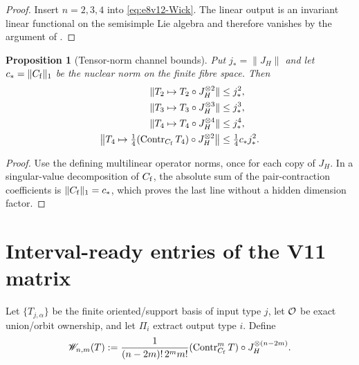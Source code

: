 \documentclass[11pt,oneside]{book}
\newtheorem{proposition}[theorem]{Proposition}
\theoremstyle{definition}
\theoremstyle{remark}
\begin{document}
\begin{proof}
Insert \(n=2,3,4\) into \eqref{eq:e8v12-Wick}.  The linear output is
an invariant linear functional on the semisimple Lie algebra and
therefore vanishes by the argument of
.
\end{proof}

\begin{proposition}[Tensor-norm channel bounds]
\label{prop:e8v12-channel-bounds}
Put \(j_*=\|J_H\|\) and let
\(c_*=\|C_{\rm f}\|_1\) be the nuclear norm on the finite fibre
space.  Then
\begin{align}
 \|T_2\mapsto T_2\circ J_H^{\otimes2}\|
 &\le j_*^2,                                       \label{eq:e8v12-G22}\\
 \|T_3\mapsto T_3\circ J_H^{\otimes3}\|
 &\le j_*^3,                                       \label{eq:e8v12-G33}\\
 \|T_4\mapsto T_4\circ J_H^{\otimes4}\|
 &\le j_*^4,                                       \label{eq:e8v12-G44}\\
 \left\|T_4\mapsto
 \tfrac14(\operatorname{Contr}_{C_{\rm f}}T_4)
             \circ J_H^{\otimes2}\right\|
 &\le\tfrac14c_*j_*^2.                             \label{eq:e8v12-G24}
\end{align}
\end{proposition}

\begin{proof}
Use the defining multilinear operator norms, once for each copy of
\(J_H\).  In a singular-value decomposition of \(C_{\rm f}\), the
absolute sum of the pair-contraction coefficients is
\(\|C_{\rm f}\|_1=c_*\), which proves the last line without a hidden
dimension factor.
\end{proof}

\section{Interval-ready entries of the V11 matrix}
\label{sec:e8v12-entries}

Let \(\{T_{j,\alpha}\}\) be the finite oriented/support basis of input
type \(j\), let \({\cal O}\) be exact union/orbit ownership, and let
\(\Pi_i\) extract output type \(i\).  Define
\[
 {\mathscr W}_{n,m}(T):=
 \frac1{(n-2m)!\,2^mm!}
 (\operatorname{Contr}_{C_{\rm f}}^mT)
 \circ J_H^{\otimes(n-2m)}.                         \label{eq:e8v12-Wnm}
\]
\end{document}
